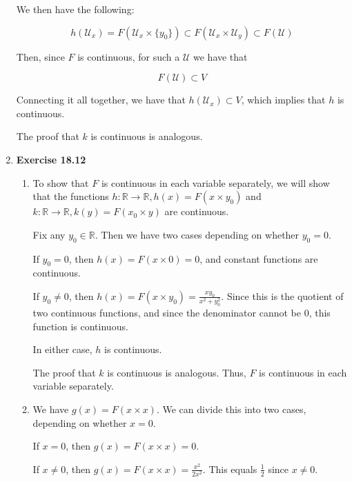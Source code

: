 \documentclass{article}
\newcommand{\U}{\mathcal{U}}
\newcommand{\R}{\mathbb{R}}
\newcommand{\sk}{\smallskip}
\begin{document}
\begin{enumerate}
    \sk

    We then have the following:

    $$h(\U_x) = F(\U_x \times \{y_0\}) \subset F(\U_x \times \U_y) \subset F(\U)$$

    Then, since $F$ is continuous, for such a $\U$ we have that 
    
    $$F(\U) \subset V$$

    Connecting it all together, we have that $h(\U_x) \subset V$, which implies that $h$ is continuous.

    \sk

    The proof that $k$ is continuous is analogous.
    
    \item \textbf{Exercise 18.12}
    \begin{enumerate}
        \item To show that $F$ is continuous in each variable separately, we will show that the functions $h: \R \rightarrow \R, h(x) = F(x \times y_0)$ and $k: \R \rightarrow \R, k(y) = F(x_0 \times y)$ are continuous. 

        \sk 

        Fix any $y_0 \in \R$. Then we have two cases depending on whether $y_0 = 0$.

        \sk 

        If $y_0 = 0$, then $h(x) = F(x \times 0) = 0$, and constant functions are continuous. 

        \sk 

        If $y_0 \neq 0$, then $h(x) = F(x \times y_0) = \frac{xy_0}{x^2+y_0^2}$. Since this is the quotient of two continuous functions, and since the denominator cannot be 0, this function is continuous. 

        \sk

        In either case, $h$ is continuous.

        \sk 

        The proof that $k$ is continuous is analogous. Thus, $F$ is continuous in each variable separately.

        \item We have $g(x) = F(x \times x)$. We can divide this into two cases, depending on whether $x = 0$. 

        \sk 

        If $x = 0$, then $g(x) = F(x \times x) = 0$.

        \sk 

        If $x \neq 0$, then $g(x) = F(x \times x) = \frac{x^2}{2x^2}$. This equals $\frac{1}{2}$ since $x \neq 0$.


\end{enumerate}
\end{enumerate}
\end{document}

